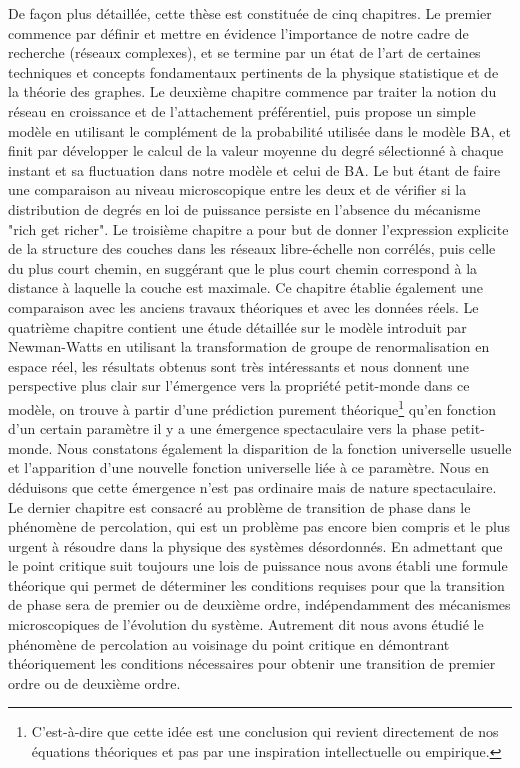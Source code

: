 De façon plus détaillée, cette thèse est constituée de cinq chapitres. Le premier commence par définir et mettre en évidence l'importance de notre cadre de recherche (réseaux complexes), et se termine par un état de l'art de  certaines techniques et concepts fondamentaux pertinents de la physique statistique et de la théorie des graphes. Le deuxième chapitre commence par traiter la notion du réseau en croissance et de l'attachement préférentiel, puis propose un simple modèle en utilisant le complément de la probabilité utilisée dans le modèle BA, et finit par développer le calcul de la valeur moyenne du degré sélectionné à chaque instant et sa fluctuation dans notre modèle et celui de BA. Le but étant de faire une comparaison au niveau microscopique entre les deux et de vérifier si la distribution de degrés en loi de puissance persiste en l'absence du mécanisme "rich get richer". Le troisième chapitre a pour but de donner l'expression explicite de la structure des couches dans les réseaux libre-échelle non corrélés, puis celle du plus court chemin, en suggérant que le plus court chemin correspond à la distance à laquelle la couche est maximale. Ce chapitre établie également une comparaison avec les anciens travaux théoriques et avec les données réels. Le quatrième chapitre contient une étude détaillée sur le modèle introduit par Newman-Watts en utilisant la transformation de groupe de renormalisation en espace réel, les résultats obtenus sont très intéressants et nous donnent une  perspective plus clair sur l'émergence vers la propriété petit-monde dans ce modèle, on trouve à partir d'une prédiction purement théorique\footnote{ 
C'est-à-dire que cette idée est une conclusion qui revient directement de nos équations théoriques et pas par une inspiration intellectuelle ou empirique.} qu'en fonction d'un certain paramètre il y a une émergence spectaculaire vers la phase petit-monde. Nous constatons également la disparition de la fonction universelle usuelle   et l'apparition d'une nouvelle fonction universelle liée à ce paramètre. Nous en déduisons que cette émergence n'est pas ordinaire mais de nature spectaculaire. Le dernier chapitre est consacré au problème de transition de phase dans le phénomène de percolation,  qui est un problème pas encore bien compris et le plus urgent à résoudre dans la physique des systèmes désordonnés. En admettant que le point critique suit toujours une lois de puissance nous avons établi une formule théorique qui permet de déterminer les conditions requises pour que la transition de phase sera de premier ou de deuxième ordre, indépendamment des mécanismes microscopiques de l'évolution du système. Autrement dit nous avons étudié le phénomène de percolation au voisinage du point critique en démontrant théoriquement les conditions nécessaires pour obtenir une transition de premier ordre ou de deuxième ordre.\\


